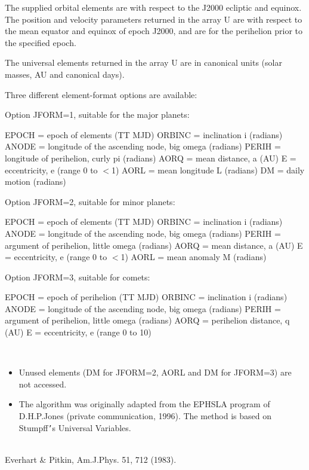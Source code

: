 \documentclass[twoside,11pt]{article}
\renewcommand{\_}{\texttt{\symbol{95}}}
\newcommand{\sstdiytopic}[2]{\item[{\hspace{-0.35em}#1\hspace{-0.35em}:}]
\mbox{} \\[1.3ex] #2}
\newcommand{\sstitemlist}[1]{
  \mbox{} \\
  \vspace{-3.5ex}
  \begin{itemize}
     #1
  \end{itemize}
}
\newcommand{\sstitem}{\item}
\newcommand{\sstdiytopic}[2]{\item[{#1}] #2 }
\newcommand{\sstitemlist}[1]{
      \begin{itemize}
         #1
      \end{itemize}
      \\
   }
\newcommand{\sstitem}{\item}
\begin{document}
{{{         \sstitem
         The supplied orbital elements are with respect to the J2000
           ecliptic and equinox.  The position and velocity parameters
           returned in the array U are with respect to the mean equator and
           equinox of epoch J2000, and are for the perihelion prior to the
           specified epoch.

         \sstitem
         The universal elements returned in the array U are in canonical
           units (solar masses, AU and canonical days).

         \sstitem
         Three different element-format options are available:

      }
        Option JFORM=1, suitable for the major planets:

        EPOCH  = epoch of elements (TT MJD)
        ORBINC = inclination i (radians)
        ANODE  = longitude of the ascending node, big omega (radians)
        PERIH  = longitude of perihelion, curly pi (radians)
        AORQ   = mean distance, a (AU)
        E      = eccentricity, e (range 0 to $<$1)
        AORL   = mean longitude L (radians)
        DM     = daily motion (radians)

        Option JFORM=2, suitable for minor planets:

        EPOCH  = epoch of elements (TT MJD)
        ORBINC = inclination i (radians)
        ANODE  = longitude of the ascending node, big omega (radians)
        PERIH  = argument of perihelion, little omega (radians)
        AORQ   = mean distance, a (AU)
        E      = eccentricity, e (range 0 to $<$1)
        AORL   = mean anomaly M (radians)

        Option JFORM=3, suitable for comets:

        EPOCH  = epoch of perihelion (TT MJD)
        ORBINC = inclination i (radians)
        ANODE  = longitude of the ascending node, big omega (radians)
        PERIH  = argument of perihelion, little omega (radians)
        AORQ   = perihelion distance, q (AU)
        E      = eccentricity, e (range 0 to 10)

      \sstitemlist{

         \sstitem
         Unused elements (DM for JFORM=2, AORL and DM for JFORM=3) are
           not accessed.

         \sstitem
         The algorithm was originally adapted from the EPHSLA program of
           D.H.P.Jones (private communication, 1996).  The method is based
           on Stumpff{\tt '}s Universal Variables.
      }
   }
   \sstdiytopic{
      See Also
   }{
      Everhart \& Pitkin, Am.J.Phys. 51, 712 (1983).
   }
}
\end{document}
